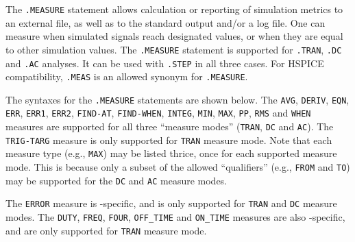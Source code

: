 


The \texttt{.MEASURE} statement allows calculation or reporting of simulation 
metrics to an external file, as well as to the standard output and/or a log file.  One can 
measure when simulated signals reach designated values, or when they are equal
to other simulation values.  The \texttt{.MEASURE} statement is supported for 
\texttt{.TRAN}, \texttt{.DC} and \texttt{.AC} analyses.  It can be used with {\tt .STEP} 
in all three cases.  For HSPICE compatibility, \texttt{.MEAS} is an allowed
synonym for \texttt{.MEASURE}.

The syntaxes for the \texttt{.MEASURE} statements are shown below.  The \texttt{AVG},
\texttt{DERIV}, \texttt{EQN},   \texttt{ERR},  \texttt{ERR1}, \texttt{ERR2}, \texttt{FIND-AT},
\texttt{FIND-WHEN}, \texttt{INTEG}, \texttt{MIN}, \texttt{MAX}, \texttt{PP}, \texttt{RMS}
and \texttt{WHEN} measures are supported for all three ``measure modes'' (\texttt{TRAN},
\texttt{DC} and \texttt{AC}).  The \texttt{TRIG-TARG} measure is only supported for
\texttt{TRAN} measure mode.  Note that each measure type (e.g., \texttt{MAX}) may be listed
thrice, once for each supported measure mode. This is because only a subset of the allowed
``qualifiers'' (e.g., \texttt{FROM} and \texttt{TO}) may be supported for the \texttt{DC}
and \texttt{AC} measure modes.

The \texttt{ERROR} measure is \Xyce{}-specific, and is only supported for \texttt{TRAN} and
\texttt{DC} measure modes.  The \texttt{DUTY}, \texttt{FREQ}, \texttt{FOUR}, \texttt{OFF\_TIME}
and \texttt{ON\_TIME} measures are also \Xyce{}-specific, and are  only supported for
\texttt{TRAN} measure mode.

